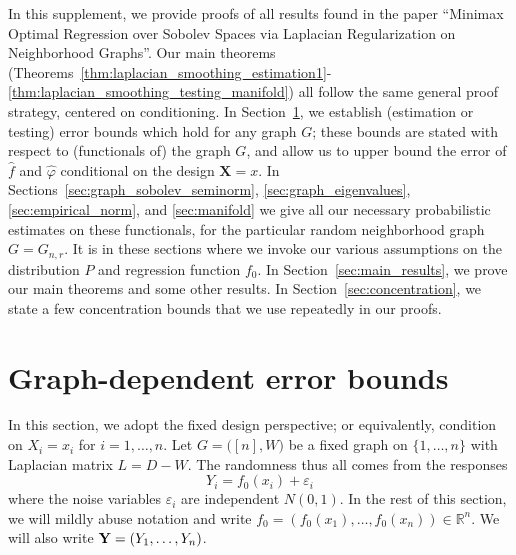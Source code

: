 \documentclass[twoside]{article}
\newcommand{\Reals}{\mathbb{R}}
\newcommand{\1}{\mathbf{1}}
\newcommand{\Lap}{L}
\newcommand{\wh}[1]{\widehat{#1}}
\theoremstyle{definition}
\theoremstyle{remark}
\begin{document}
\onecolumn	
{}

In this supplement, we provide proofs of all results found in the paper ``Minimax Optimal Regression over Sobolev Spaces via Laplacian Regularization on Neighborhood Graphs''. Our main theorems (Theorems~\ref{thm:laplacian_smoothing_estimation1}-\ref{thm:laplacian_smoothing_testing_manifold}) all follow the same general proof strategy, centered on conditioning. In Section~\ref{sec:fixed_graph_error_bounds}, we establish (estimation or testing) error bounds which hold for any graph $G$; these bounds are stated with respect to (functionals of) the graph $G$, and allow us to upper bound the error of $\wh{f}$ and $\wh{\varphi}$ conditional on the design $\mathbf{X} = x$. In Sections~\ref{sec:graph_sobolev_seminorm}, \ref{sec:graph_eigenvalues}, \ref{sec:empirical_norm}, and \ref{sec:manifold} we give all our necessary probabilistic estimates on these functionals, for the particular random neighborhood graph $G = G_{n,r}$. It is in these sections where we invoke our various assumptions on the distribution $P$ and regression function $f_0$. In Section~\ref{sec:main_results}, we prove our main theorems and some other results. In Section~\ref{sec:concentration}, we state a few concentration bounds that we use repeatedly in our proofs.

\vfill

\clearpage

\section{Graph-dependent error bounds}
\label{sec:fixed_graph_error_bounds}
In this section, we adopt the fixed design perspective; or equivalently, condition on $X_i = x_i$ for $i = 1,\ldots,n$. Let $G = \bigl([n],W\bigr)$ be a fixed graph on $\{1,\ldots,n\}$ with Laplacian matrix $\Lap = D - W$. The randomness thus all comes from the responses 
\begin{equation}
\label{eqn:fixed_graph_regression_model}
Y_i = f_{0}(x_i) + \varepsilon_i
\end{equation}
where the noise variables $\varepsilon_i$ are independent $N(0,1)$. In the rest of this section, we will mildly abuse notation and write $f_0 = (f_0(x_1),\ldots,f_0(x_n)) \in \Reals^n$. We will also write ${\bf Y} = (Y_1,\ldots,Y_n)$.
\end{document}
